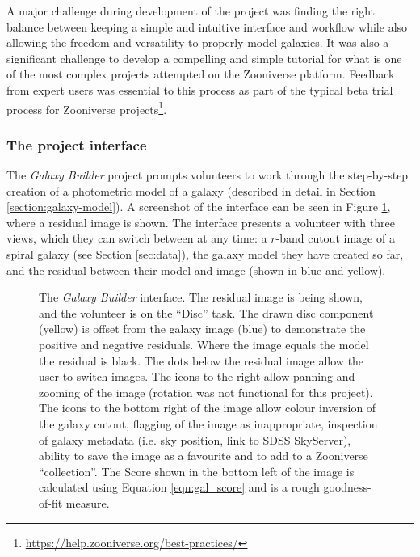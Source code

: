 \documentclass[main\.tex]{subfiles}
\begin{document}
A major challenge during development of the project was finding the right balance between keeping a simple and intuitive interface and workflow while also allowing the freedom and versatility to properly model galaxies. It was also a significant challenge to develop a compelling and simple tutorial for what is one of the most complex projects attempted on the Zooniverse platform. Feedback from expert users was essential to this process as part of the typical beta trial process for Zooniverse projects\footnote{\url{https://help.zooniverse.org/best-practices/}}.


\subsubsection{The project interface}

The \textit{Galaxy Builder} project prompts volunteers to work through the step-by-step creation of a photometric model of a galaxy (described in detail in Section \ref{section:galaxy-model}). A screenshot of the interface can be seen in Figure \ref{fig:interfaceInProgress}, where a residual image is shown. The interface presents a volunteer with three views, which they can switch between at any time: a $r$-band cutout image of a spiral galaxy (see Section \ref{sec:data}), the galaxy model they have created so far, and the residual between their model and image (shown in blue and yellow).

\begin{figure}
  \caption{The \textit{Galaxy Builder} interface. The residual image is being shown, and the volunteer is on the ``Disc'' task. The drawn disc component (yellow) is offset from the galaxy image (blue) to demonstrate the positive and negative residuals. Where the image equals the model the residual is black. The dots below the residual image allow the user to switch images. The icons to the right allow panning and zooming of the image (rotation was not functional for this project). The icons to the bottom right of the image allow colour inversion of the galaxy cutout, flagging of the image as inappropriate, inspection of galaxy metadata (i.e. sky position, link to SDSS SkyServer), ability to save the image as a favourite and to add to a Zooniverse ``collection''. The Score shown in the bottom left of the image is calculated using Equation \ref{eqn:gal_score} and is a rough goodness-of-fit measure.}
  \label{fig:interfaceInProgress}
\end{figure}
\end{document}
